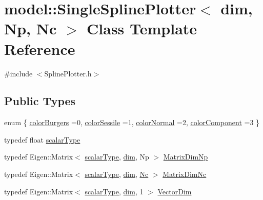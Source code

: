 \hypertarget{classmodel_1_1_single_spline_plotter}{}\section{model\+:\+:Single\+Spline\+Plotter$<$ dim, Np, Nc $>$ Class Template Reference}
\label{classmodel_1_1_single_spline_plotter}


{\ttfamily \#include $<$Spline\+Plotter.\+h$>$}

\subsection*{Public Types}
\begin{DoxyCompactItemize}
\item 
enum \{ \hyperlink{classmodel_1_1_single_spline_plotter_af369241d2576127a458664938dd31613a9411d6fc67fe8675630d1de6b8bcd2c9}{color\+Burgers} =0, 
\hyperlink{classmodel_1_1_single_spline_plotter_af369241d2576127a458664938dd31613ae8649b0a27fea7a9d042b7cb407ac1d3}{color\+Sessile} =1, 
\hyperlink{classmodel_1_1_single_spline_plotter_af369241d2576127a458664938dd31613a2e9de7e502f85ead8eb007c953531c28}{color\+Normal} =2, 
\hyperlink{classmodel_1_1_single_spline_plotter_af369241d2576127a458664938dd31613ac431f520d5e156dad5150cb9a253799e}{color\+Component} =3
 \}
\item 
typedef float \hyperlink{classmodel_1_1_single_spline_plotter_aa7a9de72b38d4d60ca52a5b62570e45a}{scalar\+Type}
\item 
typedef Eigen\+::\+Matrix$<$ \hyperlink{classmodel_1_1_single_spline_plotter_aa7a9de72b38d4d60ca52a5b62570e45a}{scalar\+Type}, \hyperlink{plot_nd_a_8m_a382f3ca768b275b8d563604f7fc7df73}{dim}, Np $>$ \hyperlink{classmodel_1_1_single_spline_plotter_a32dbbb243ef2981d79a67a22a19f4d17}{Matrix\+Dim\+Np}
\item 
typedef Eigen\+::\+Matrix$<$ \hyperlink{classmodel_1_1_single_spline_plotter_aa7a9de72b38d4d60ca52a5b62570e45a}{scalar\+Type}, \hyperlink{plot_nd_a_8m_a382f3ca768b275b8d563604f7fc7df73}{dim}, \hyperlink{run_multipole_8m_a8de17588e86659e4d31ccdbd2a9aa387}{Nc} $>$ \hyperlink{classmodel_1_1_single_spline_plotter_a6dae49d6511813e2ff0f2c3bd1f5c200}{Matrix\+Dim\+Nc}
\item 
typedef Eigen\+::\+Matrix$<$ \hyperlink{classmodel_1_1_single_spline_plotter_aa7a9de72b38d4d60ca52a5b62570e45a}{scalar\+Type}, \hyperlink{plot_nd_a_8m_a382f3ca768b275b8d563604f7fc7df73}{dim}, 1 $>$ \hyperlink{classmodel_1_1_single_spline_plotter_aac0dc9b9bcd8a574fab46652cc669602}{Vector\+Dim}
\end{DoxyCompactItemize}
